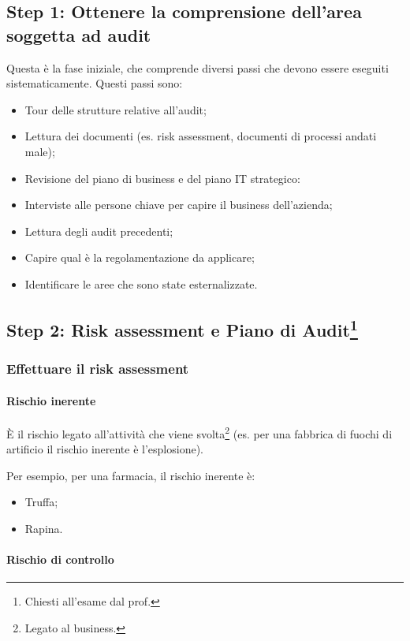 \subsection{Step 1: Ottenere la comprensione dell'area soggetta ad audit}

Questa è la fase iniziale, che comprende diversi passi che devono essere
eseguiti sistematicamente.
Questi passi sono:
\begin{itemize}
\item Tour delle strutture relative all'audit;
\item Lettura dei documenti (es. risk assessment, documenti di processi andati
male);
\item Revisione del piano di business e del piano IT strategico:
\item Interviste alle persone chiave per capire il business dell'azienda;
\item Lettura degli audit precedenti;
\item Capire qual è la regolamentazione da applicare;
\item Identificare le aree che sono state esternalizzate.
\end{itemize}

\subsection[Step 2: Risk assessment e Piano di Audit]{Step 2: Risk
assessment e Piano di Audit\protect\footnote{Chiesti all'esame dal
prof.}}

\subsubsection{Effettuare il risk assessment}

\paragraph*{Rischio inerente}

È il rischio legato all'attività che viene svolta\footnote{Legato al business.}
(es. per una fabbrica di fuochi di artificio il rischio inerente è
l'esplosione).

Per esempio, per una farmacia, il rischio inerente è:
\begin{itemize}
\item Truffa;
\item Rapina.
\end{itemize}

\paragraph*{Rischio di controllo}

